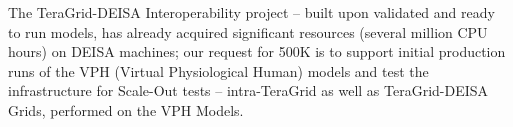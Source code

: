 \documentclass[a4paper,10pt]{article}
\begin{document}
The TeraGrid-DEISA Interoperability project -- built upon validated and ready to run models, has already acquired significant resources (several million CPU hours) on DEISA machines; our request for 500K is to support initial production runs of the VPH (Virtual Physiological Human) models and test the infrastructure for Scale-Out tests -- intra-TeraGrid as well as TeraGrid-DEISA Grids, performed on the VPH Models.




\end{document}
